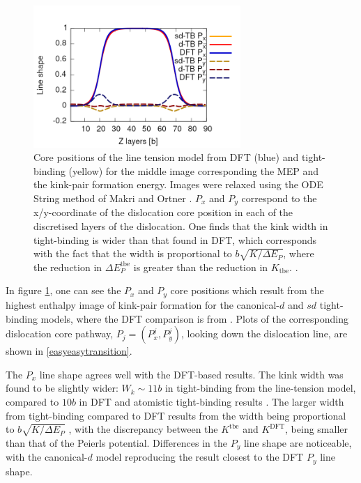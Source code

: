 \documentclass[a4paper,12pt,oneside,print,numbered,index,PageStyleIII]{PhDThesisPSnPDF}
\begin{document}
\begin{enumerate}
\begin{figure}[htbp]
\centering
\includegraphics[width=0.7\textwidth]{iron/Images/lineshape-all_correct_gradient.png}
\caption{Core positions of the line tension model from DFT (blue) and tight-binding (yellow) for the middle image corresponding the MEP and the kink-pair formation energy. Images were relaxed using the ODE String method of Makri and Ortner \cite{Makri2019}. \(P_x\) and \(P_y\) correspond to the x/y-coordinate of the dislocation core position in each of the discretised layers of the dislocation. One finds that the kink width in tight-binding is wider than that found in DFT, which corresponds with the fact that the width is proportional to \(b\sqrt{K/\Delta E_P}\), where the reduction in \(\Delta E_P^{\text{tbe}}\) is greater than the reduction in \(K_{\text{tbe}}\).   \label{lineshape}.}
\end{figure}



In figure \ref{lineshape}, one can see the \(P_x\) and \(P_y\) core positions which
result from the highest enthalpy image of kink-pair formation for the
canonical-\(d\) and \(sd\) tight-binding models, where the DFT comparison is from
\cite{Itakura2012}. Plots of the corresponding dislocation core pathway, \(P_j =
     (P^j_x, P^j_y)\), looking down the dislocation line, are shown in
\ref{easyeasytransition}.

The \(P_x\) line shape agrees well with the DFT-based results. The kink width
was found to be slightly wider: \(W_k \sim 11b\) in tight-binding from the
line-tension model, compared to \(10b\) in DFT and atomistic tight-binding
results \cite{Simpson2019}. The larger width from tight-binding compared to
DFT results from the width being proportional to \(b\sqrt{K/\Delta E_P}\)
\cite{Itakura2012}, with the discrepancy between the \(K^{\text{tbe} }\) and
\(K^{\text{DFT} }\), being smaller than that of the Peierls
potential. Differences in the \(P_y\) line shape are noticeable, with the
canonical-\(d\) model reproducing the result closest to the DFT \(P_y\) line
shape.


\end{enumerate}
\end{document}
